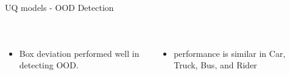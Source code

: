 \documentclass[10pt, aspectratio=169]{beamer}
\begin{document}
\begin{frame}[allowframebreaks]{UQ models - OOD Detection}
\begin{table}[tbp]
{\begin{tabular}{lllllllllllc}
        \end{tabular}%
        }
        \end{table}
        \begin{columns}
                \begin{itemize}
                    \item Box deviation performed well in detecting OOD.
                \end{itemize}
                \begin{itemize}
                    \item performance is similar in Car, Truck, Bus, and Rider 
                \end{itemize}
        \end{columns}
        \pagebreak


\end{frame}
\end{document}
